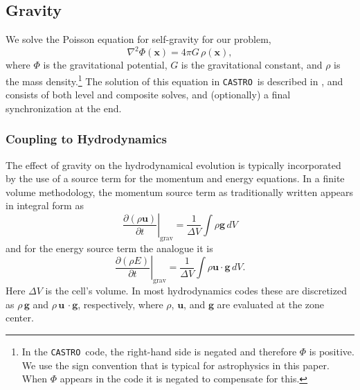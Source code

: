 \documentclass[iop]{../emulateapj}
\newcommand{\castro}{\texttt{CASTRO}}
\begin{document}
\subsection{Gravity}
\label{sec:gravity}

We solve the Poisson equation for self-gravity for our problem,
\begin{equation}
  \nabla^2 \Phi(\mathbf{x}) = 4\pi G\, \rho(\mathbf{x}),
\end{equation}
where $\Phi$ is the gravitational potential, $G$ is the gravitational
constant, and $\rho$ is the mass density.\footnote{In the \castro\ code, the 
right-hand side is negated and therefore $\Phi$ is positive. We use the 
sign convention that is typical for astrophysics in this paper. 
When $\Phi$ appears in the code it is negated to compensate for this.} 
The solution of this equation in \castro\ is described in \cite{castro}, and
consists of both level and composite solves, and (optionally) a final
synchronization at the end.

\subsubsection{Coupling to Hydrodynamics}\label{sec:gravity_hydro_coupling}

The effect of gravity on the hydrodynamical evolution is typically
incorporated by the use of a source term for the momentum and energy
equations. In a finite volume methodology, the momentum source term 
as traditionally written appears in integral form as
\begin{equation}
  \left.\frac{\partial (\rho \mathbf{u})}{\partial t}\right|_{\text{grav}} = \frac{1}{\Delta V} \int \rho \mathbf{g}\, dV
\end{equation}
and for the energy source term the analogue it is
\begin{equation}
  \left.\frac{\partial (\rho E)}{\partial t}\right|_{\text{grav}} = \frac{1}{\Delta V} \int \rho \mathbf{u}\cdot\mathbf{g}\, dV \label{eq:cell_center_gravity_source}.
\end{equation}
Here $\Delta V$ is the cell's volume.
In most hydrodynamics codes these are discretized as $\rho\,
\mathbf{g}$ and $\rho\, \mathbf{u}\,\cdot\mathbf{g}$, respectively, 
where $\rho$, $\mathbf{u}$, and $\mathbf{g}$ 
are evaluated at the zone center. 
\end{document}
